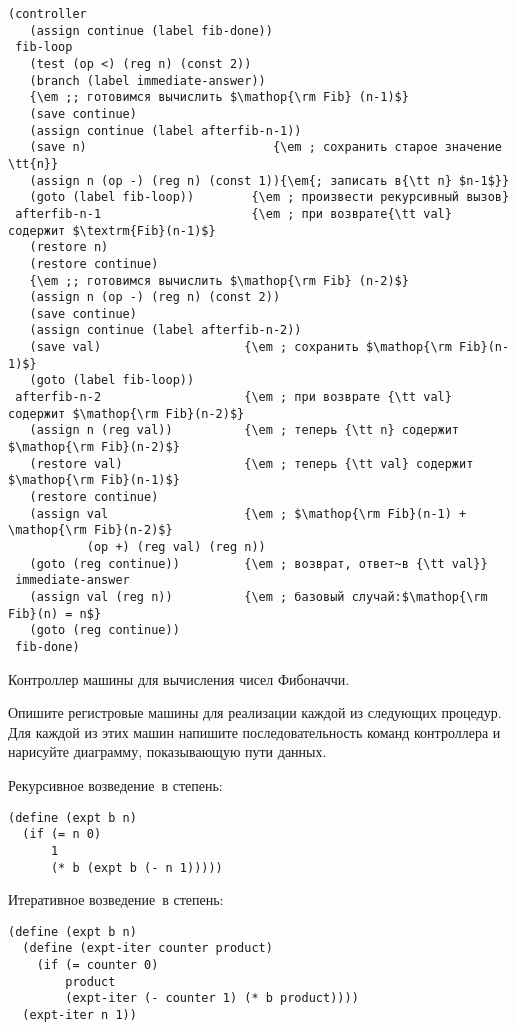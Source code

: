\newpage

\begin{cntrfig}
\begin{Verbatim}[fontsize=\small]
(controller
   (assign continue (label fib-done))
 fib-loop
   (test (op <) (reg n) (const 2))
   (branch (label immediate-answer))
   {\em ;; готовимся вычислить $\mathop{\rm Fib} (n-1)$}
   (save continue)
   (assign continue (label afterfib-n-1))
   (save n)                          {\em ; сохранить старое значение \tt{n}}
   (assign n (op -) (reg n) (const 1)){\em{; записать в{\tt n} $n-1$}}
   (goto (label fib-loop))        {\em ; произвести рекурсивный вызов}
 afterfib-n-1                     {\em ; при возврате{\tt val} содержит $\textrm{Fib}(n-1)$}
   (restore n)
   (restore continue)
   {\em ;; готовимся вычислить $\mathop{\rm Fib} (n-2)$}
   (assign n (op -) (reg n) (const 2))
   (save continue)
   (assign continue (label afterfib-n-2))
   (save val)                    {\em ; сохранить $\mathop{\rm Fib}(n-1)$}
   (goto (label fib-loop))
 afterfib-n-2                    {\em ; при возврате {\tt val} содержит $\mathop{\rm Fib}(n-2)$}
   (assign n (reg val))          {\em ; теперь {\tt n} содержит $\mathop{\rm Fib}(n-2)$}
   (restore val)                 {\em ; теперь {\tt val} содержит $\mathop{\rm Fib}(n-1)$}
   (restore continue)
   (assign val                   {\em ; $\mathop{\rm Fib}(n-1) + \mathop{\rm Fib}(n-2)$}
           (op +) (reg val) (reg n)) 
   (goto (reg continue))         {\em ; возврат, ответ~в {\tt val}}
 immediate-answer
   (assign val (reg n))          {\em ; базовый случай:$\mathop{\rm Fib}(n) = n$}
   (goto (reg continue))
 fib-done)
\end{Verbatim}
\caption{Контроллер машины для вычисления чисел Фибоначчи.
}
\label{P5.12}

\end{cntrfig}
\begin{exercise}{5.4}\label{EX5.4}%
Опишите регистровые машины для реализации каждой из
следующих процедур.  Для каждой из этих машин напишите
последовательность команд контроллера и нарисуйте диаграмму,
показывающую пути данных.

\begin{plainenum}


\item
Рекурсивное возведение~в степень:

\begin{Verbatim}[fontsize=\small]
(define (expt b n)
  (if (= n 0)
      1
      (* b (expt b (- n 1)))))
\end{Verbatim}

\item
Итеративное возведение~в степень:

\begin{Verbatim}[fontsize=\small]
(define (expt b n)
  (define (expt-iter counter product)
    (if (= counter 0)
        product
        (expt-iter (- counter 1) (* b product))))
  (expt-iter n 1))
\end{Verbatim}
\end{plainenum}
\end{exercise}
